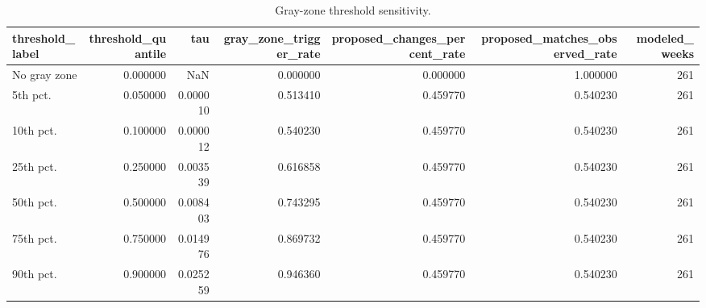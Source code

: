\begin{table}
\caption{Gray-zone threshold sensitivity.}
\begin{tabular}{lrrrrrr}
\toprule
threshold\_label & threshold\_quantile & tau & gray\_zone\_trigger\_rate & proposed\_changes\_percent\_rate & proposed\_matches\_observed\_rate & modeled\_weeks \\
\midrule
No gray zone & 0.000000 & NaN & 0.000000 & 0.000000 & 1.000000 & 261 \\
5th pct. & 0.050000 & 0.000010 & 0.513410 & 0.459770 & 0.540230 & 261 \\
10th pct. & 0.100000 & 0.000012 & 0.540230 & 0.459770 & 0.540230 & 261 \\
25th pct. & 0.250000 & 0.003539 & 0.616858 & 0.459770 & 0.540230 & 261 \\
50th pct. & 0.500000 & 0.008403 & 0.743295 & 0.459770 & 0.540230 & 261 \\
75th pct. & 0.750000 & 0.014976 & 0.869732 & 0.459770 & 0.540230 & 261 \\
90th pct. & 0.900000 & 0.025259 & 0.946360 & 0.459770 & 0.540230 & 261 \\
\bottomrule
\end{tabular}
\end{table}
